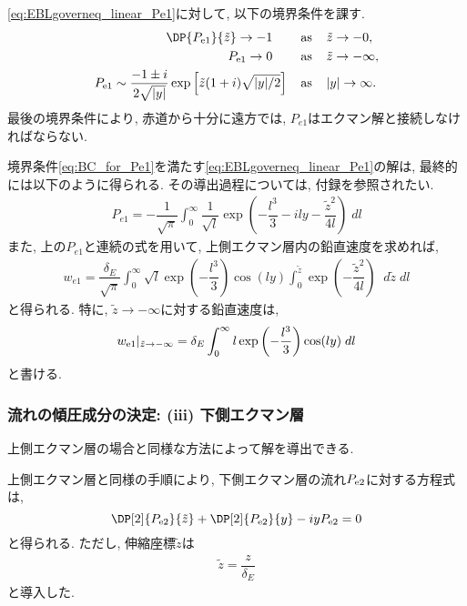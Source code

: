 \eqref{eq:EBLgoverneq_linear_Pe1}に対して, 以下の境界条件を課す.  
\begin{subequations}
 \begin{align}
    \DP{P_{\rm e1}}{\tilde{z}} \to -1  \;\;\;\;\;\;\;\; &{\rm as} \;\;\;\; \tilde{z} \to -0, \\
    P_{\rm e1} \to 0 \;\;\;\;\;\;\;\; &{\rm as} \;\;\;\; \tilde{z} \to - \infty, \\
    P_{\rm e1} \sim \dfrac{-1 \pm i}{2 \sqrt{|y|}} \exp{\left[ \tilde{z} (1+i) \sqrt{|y|/2} \right]}
       \;\;\;\; &{\rm as} \;\;\;\; |y| \to  \infty. 
 \end{align}
\label{eq:BC_for_Pe1}
\end{subequations}
最後の境界条件により, 赤道から十分に遠方では, $P_{e1}$はエクマン解と接続しなければならない. 

境界条件\eqref{eq:BC_for_Pe1}を満たす\eqref{eq:EBLgoverneq_linear_Pe1}の解は, 最終的には以下のように得られる. 
その導出過程については, 付録を参照されたい. 
\begin{align}
\boxed{
  P_{e1} = - \dfrac{1}{\sqrt{\pi}} \int_0^\infty \dfrac{1}{\sqrt{l}} 
             \exp{\left( -\dfrac{l^3}{3} - ily - \dfrac{\tilde{z}^2}{4l} \right)} \; dl
}
\end{align}
また, 上の$P_{e1}$と連続の式を用いて, 上側エクマン層内の鉛直速度を求めれば, 
\begin{align}
\boxed{
  w_{e1} = \dfrac{\delta_E}{\sqrt{\pi}} \int_0^\infty \sqrt{l} \exp \left(-\dfrac{l^3}{3} \right) \cos (ly) 
              \int_0^{\tilde{z}} \exp \left(-\dfrac{\tilde{z}^2}{4l} \right) \;\; d\tilde{z} \; dl
}
\end{align}
と得られる. 
特に, $\tilde{z} \to -\infty$に対する鉛直速度は, 
\begin{align}
 w_{\rm e1} |_{\tilde{z} \to - \infty} = \delta_E \int_0^\infty l \exp \left(-\dfrac{l^3}{3}\right)  \cos(ly) \; dl
\end{align}
と書ける. 

\subsubsection*{流れの傾圧成分の決定: (iii) 下側エクマン層}
上側エクマン層の場合と同様な方法によって解を導出できる. 

上側エクマン層と同様の手順により, 下側エクマン層の流れ$P_{\rm e2}$に対する方程式は, 
\begin{equation}
  \DP[2]{P_{\rm e2}}{\tilde{z}} + \DP[2]{P_{\rm e2}}{y} - iy P_{\rm e2} = 0
\label{eq:EBLgoverneq_linear_Pe2}
\end{equation}
と得られる. 
ただし, 伸縮座標$\tilde{z}$は
\begin{align}
  \tilde{z} = \dfrac{z}{\delta_E}
\end{align}
と導入した. 

